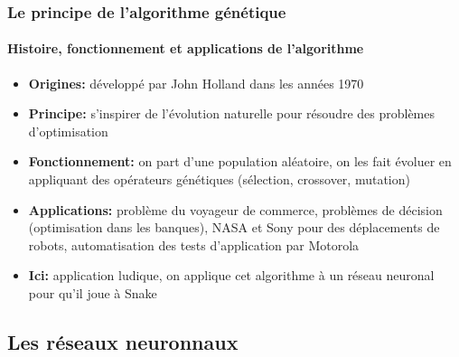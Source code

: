 \documentclass[10pt]{beamer}
\begin{document}
\begin{frame}
  \frametitle{Le principe de l'algorithme génétique}
  \framesubtitle{Histoire, fonctionnement et applications de l'algorithme}    
  
  \begin{itemize}

    \item \textbf{Origines:} développé par John Holland dans les années 1970

    \item \textbf{Principe:} s'inspirer de l'évolution naturelle pour
    résoudre des problèmes d'optimisation

    \item \textbf{Fonctionnement:} on part d'une population aléatoire, on les fait évoluer en appliquant des opérateurs
    génétiques (sélection, crossover, mutation)

    \item \textbf{Applications:} problème du voyageur de commerce, problèmes de décision (optimisation dans les banques), NASA et Sony pour des déplacements de robots, automatisation des tests d'application par Motorola
    
    \item \textbf{Ici:} application ludique, on applique cet algorithme à un réseau neuronal pour qu'il joue à Snake
   

  \end{itemize}  
  \end{frame}
  
  \begin{frame}
  

	
  \end{frame}


\subsection{Les réseaux neuronnaux}
\end{document}
